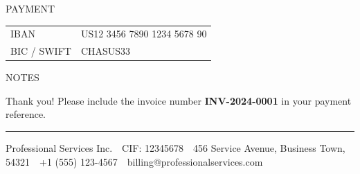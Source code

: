 \documentclass[10pt,a4paper]{article}
\makeatletter
\newcommand{\companyname}{Professional Services Inc.}
\newcommand{\companycif}{CIF: 12345678}
\newcommand{\companystreet}{456 Service Avenue}
\newcommand{\companycity}{Business Town, 54321}
\newcommand{\companyphone}{+1 (555) 123-4567}
\newcommand{\companyemail}{billing@professionalservices.com}
\newcommand{\invoicenumber}{INV-2024-0001}
\newcommand{\companyiban}{US12 3456 7890 1234 5678 90}
\newcommand{\companybic}{CHASUS33}
\newcommand{\itemskip}{\vspace{0.9cm}}
\newlength{\smallgap}
\newcommand{\layoutlabel}[1]{\textcolor{muted}{\ttfamily\footnotesize\MakeUppercase{#1}}}
\newcommand{\contactinfo}[1]{\textcolor{muted}{\small #1}}
\newcommand{\monovalue}[1]{{\ttfamily #1}}
\newcommand{\hairlinerule}{\par\noindent\textcolor{hairline}{\rule{\textwidth}{0.6pt}}\par}
\newcommand{\sectionheader}[1]{%
    \noindent\layoutlabel{#1}%
    \par\vspace{0.3cm}\noindent%
}
\makeatother
\begin{document}
\sectionheader{Payment}
\begin{tabular}{@{}p{2.6cm}l@{}}
    \layoutlabel{IBAN}        & \monovalue{\companyiban} \\[\smallgap]
    \layoutlabel{BIC / SWIFT} & \monovalue{\companybic}  \\
\end{tabular}

\itemskip

\sectionheader{Notes}
\contactinfo{Thank you! Please include the invoice number
    \textcolor{ink}{\bfseries\invoicenumber} in your payment reference.}

\vfill
\hairlinerule
\begin{center}
    \textcolor{muted}{\ttfamily\footnotesize
        \companyname\ \textperiodcentered\ \companycif\ \textperiodcentered\
        \companystreet, \companycity\ \textperiodcentered\
        \companyphone\ \textperiodcentered\ \companyemail}
\end{center}
\end{document}
